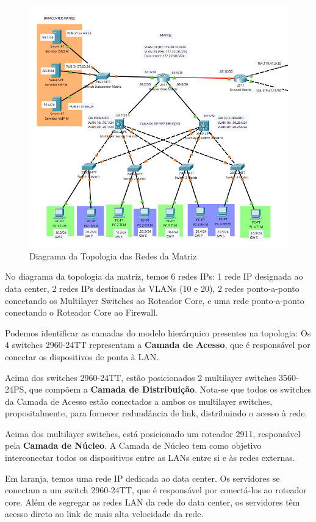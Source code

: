 \documentclass[a4paper, 12pt]{article}
\begin{document}
\begin{figure}[H]
    \centering
    \includegraphics[width=0.8\linewidth]{matriz.png}
    \caption{Diagrama da Topologia das Redes da Matriz}
    \label{fig:matriz}
\end{figure}

No diagrama da topologia da matriz, temos 6 redes IPs: 1 rede IP designada ao data center, 2 redes IPs destinadas às VLANs (10 e 20), 2 redes ponto-a-ponto conectando os Multilayer Switches ao Roteador Core, e uma rede ponto-a-ponto conectando o Roteador Core ao Firewall.

Podemos identificar as camadas do modelo hierárquico presentes na topologia: Os 4 switches 2960-24TT representam a \textbf{Camada de Acesso}, que é responsável por conectar os dispositivos de ponta à LAN.

Acima dos switches 2960-24TT, estão posicionados 2 multilayer switches 3560-24PS, que compõem a \textbf{Camada de Distribuição}. Nota-se que todos os switches da Camada de Acesso estão conectados a ambos os multilayer switches, propositalmente, para fornecer redundância de link, distribuindo o acesso à rede.

Acima dos multilayer switches, está posicionado um roteador 2911, responsável pela \textbf{Camada de Núcleo}. A Camada de Núcleo tem como objetivo interconectar todos os dispositivos entre as LANs entre si e às redes externas.

Em laranja, temos uma rede IP dedicada ao data center. Os servidores se conectam a um switch 2960-24TT, que é responsável por conectá-los ao roteador core. Além de segregar as redes LAN da rede do data center, os servidores têm acesso direto ao link de mais alta velocidade da rede.
\end{document}
